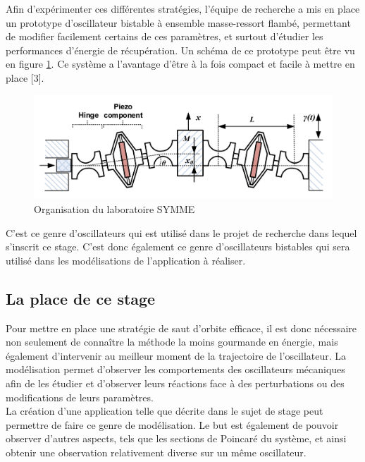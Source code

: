 \documentclass[a4paper, french, 12pt, titlepage]{article}
\begin{document}
Afin d'expérimenter ces différentes stratégies, l'équipe de recherche a mis en place un prototype d'oscillateur bistable à ensemble masse-ressort flambé, permettant de modifier facilement certains de ces paramètres, et surtout d'étudier les performances d'énergie de récupération. Un schéma de ce prototype peut être vu en figure \ref{fig:prototype}. Ce système a l'avantage d'être à la fois compact et facile à mettre en place [3]. \\


\begin{figure}[H]
  \includegraphics[width=\linewidth]{prototype.png}
  \caption{Organisation du laboratoire SYMME}
  \label{fig:prototype}
\end{figure}

C'est ce genre d'oscillateurs qui est utilisé dans le projet de recherche dans lequel s'inscrit ce stage. C'est donc également ce genre d'oscillateurs bistables qui sera utilisé dans les modélisations de l'application à réaliser.\\

\subsection{La place de ce stage}

Pour mettre en place une stratégie de saut d'orbite efficace, il est donc nécessaire non seulement de connaître la méthode la moins gourmande en énergie, mais également d'intervenir au meilleur moment de la trajectoire de l'oscillateur. La modélisation permet d'observer les comportements des oscillateurs mécaniques afin de les étudier et d'observer leurs réactions face à des perturbations ou des modifications de leurs paramètres. \\

La création d'une application telle que décrite dans le sujet de stage peut permettre de faire ce genre de modélisation. Le but est également de pouvoir observer d'autres aspects, tels que les sections de Poincaré du système, et ainsi obtenir une observation relativement diverse sur un même oscillateur. \\
\end{document}
